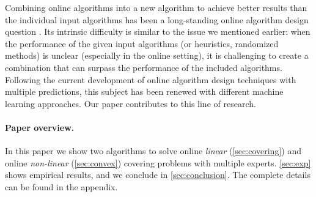 Combining online algorithms into a new algorithm to achieve better results than the individual input algorithms has been a long-standing online algorithm design question \cite{AzarBroder93:On-line-Choice,BlumBurch00:On-line-Learning}.
Its intrinsic difficulty is similar to the issue we mentioned earlier: when the performance of the given input algorithms (or heuristics, randomized methods) is unclear (especially in the online setting), it is challenging to create a combination that can surpass the performance of the included algorithms.
Following the current development of online algorithm design techniques with multiple predictions, this subject has been renewed with different machine learning approaches. Our paper contributes to this line of research.

\paragraph{Paper overview.}
In this paper we show two algorithms to solve online \emph{linear} (\cref{sec:covering}) and online \emph{non-linear} (\cref{sec:convex}) covering problems with multiple experts.  \cref{sec:exp} shows empirical results, and we conclude in \cref{sec:conclusion}. The complete details can be found in the appendix.
